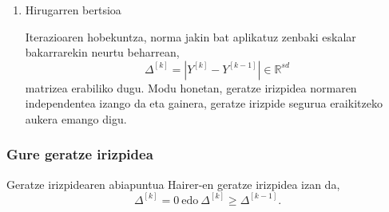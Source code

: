 \begin{enumerate}
\item Hirugarren bertsioa

Iterazioaren hobekuntza, norma jakin bat aplikatuz zenbaki eskalar bakarrarekin neurtu beharrean,
\begin{equation}
\label{eq:DD3}
\Delta^{[k]}=|Y^{[k]}-Y^{[k-1]}| \in \mathbb{R}^{sd}
\end{equation}
matrizea erabiliko dugu. Modu honetan, geratze irizpidea normaren independentea izango da eta gainera, geratze irizpide segurua eraikitzeko aukera emango digu.

\end{enumerate} 


\subsubsection*{Gure geratze irizpidea}

Geratze irizpidearen abiapuntua Hairer-en geratze irizpidea izan da,
\begin{equation*}
\Delta ^{[k]}=0 \ \text{edo} \ \Delta^{[k]} \geqslant \Delta^{[k-1]}.
\end{equation*}


